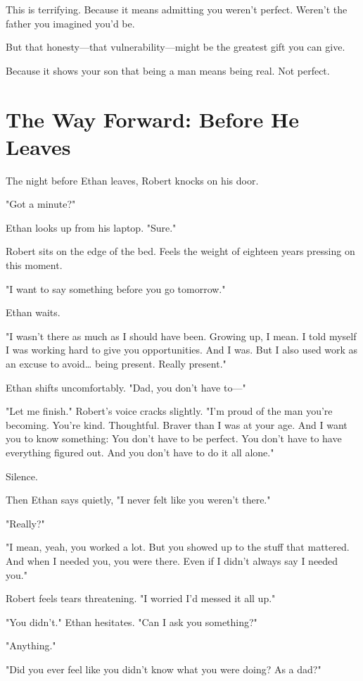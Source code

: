 \documentclass[11pt,twoside]{book}
\begin{document}
This is terrifying. Because it means admitting you weren't perfect. Weren't the father you imagined you'd be.

But that honesty—that vulnerability—might be the greatest gift you can give.

Because it shows your son that being a man means being real. Not perfect.

\section*{The Way Forward: Before He Leaves}

The night before Ethan leaves, Robert knocks on his door.

"Got a minute?"

Ethan looks up from his laptop. "Sure."

Robert sits on the edge of the bed. Feels the weight of eighteen years pressing on this moment.

"I want to say something before you go tomorrow."

Ethan waits.

"I wasn't there as much as I should have been. Growing up, I mean. I told myself I was working hard to give you opportunities. And I was. But I also used work as an excuse to avoid\ldots{} being present. Really present."

Ethan shifts uncomfortably. "Dad, you don't have to—"

"Let me finish." Robert's voice cracks slightly. "I'm proud of the man you're becoming. You're kind. Thoughtful. Braver than I was at your age. And I want you to know something: You don't have to be perfect. You don't have to have everything figured out. And you don't have to do it all alone."

Silence.

Then Ethan says quietly, "I never felt like you weren't there."

"Really?"

"I mean, yeah, you worked a lot. But you showed up to the stuff that mattered. And when I needed you, you were there. Even if I didn't always say I needed you."

Robert feels tears threatening. "I worried I'd messed it all up."

"You didn't." Ethan hesitates. "Can I ask you something?"

"Anything."

"Did you ever feel like you didn't know what you were doing? As a dad?"
\end{document}
